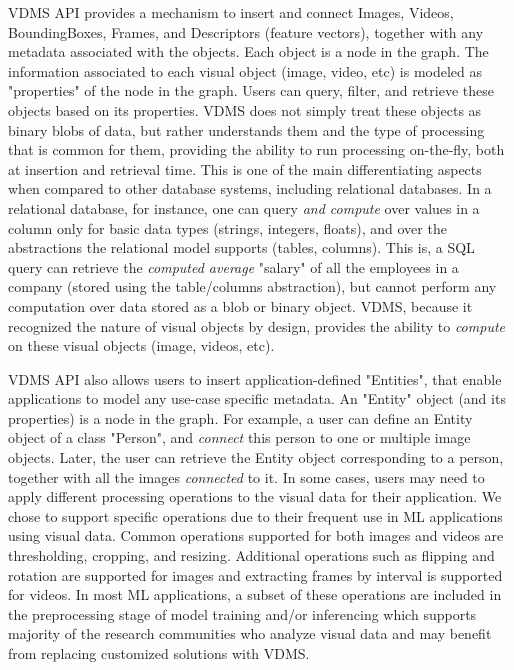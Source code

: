 VDMS API provides a mechanism to insert and connect Images, Videos, BoundingBoxes,
Frames, and Descriptors (feature vectors), together with any metadata
associated with the objects.
Each object is a node in the graph.
The information associated to each visual object (image, video, etc) is modeled as
"properties" of the node in the graph.
Users can query, filter, and retrieve these objects based on its properties.
VDMS does not simply treat these objects as binary blobs of data, but rather
understands them and the type of processing that is common for them,
providing the ability to run processing on-the-fly, both at insertion and
retrieval time. This is one of the main differentiating aspects when compared to other
database systems, including relational databases.
In a relational database, for instance, one can query \textit{and compute}
over values in a column only for basic data types (strings, integers, floats),
and over the abstractions the relational model supports (tables, columns).
This is, a SQL query can retrieve the \textit{computed average} "salary" of all
the employees in a company (stored using the table/columns abstraction),
but cannot perform any computation over data stored as a blob or binary object.
VDMS, because it recognized the nature of visual objects by design,
provides the ability to \textit{compute} on these visual objects
(image, videos, etc).

VDMS API also allows users to insert application-defined "Entities",
that enable applications to model any use-case specific metadata.
An "Entity" object (and its properties) is a node in the graph.
For example, a user can define an Entity object of a class "Person",
and \textit{connect} this person to one or multiple image objects.
Later, the user can retrieve the Entity object corresponding to a person,
together with all the images \textit{connected} to it. In some cases,
users may need to apply different processing operations to the visual data
for their application. We chose to support
specific operations due to their frequent use in ML applications using
visual data. Common operations supported for both images and videos are
thresholding, cropping, and resizing. Additional operations such as
flipping and rotation are supported for images and extracting
frames by interval is supported for videos.
In most ML applications, a subset of these operations are included in
the preprocessing stage of model training and/or inferencing which supports
majority of the research communities who analyze visual data and may benefit
from replacing customized solutions with VDMS.

